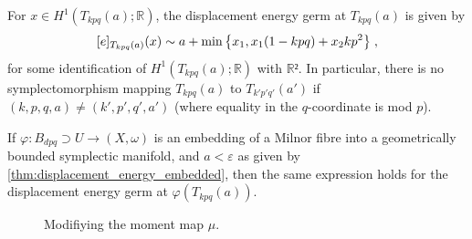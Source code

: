 \documentclass[12pt,a4paper,draft]{scrartcl}
\begin{document}
\begin{theorem}
  \label{thm:main}

  For $x ∈ H^1(T_{kpq}(a); ℝ)$, the displacement energy germ at $T_{kpq}(a)$ is given by
  \[ [e]_{T_{kpq}(a)} (x) \sim a + \min\qty{x_1, x_1 (1-kpq) + x_2 k p^2} \; , \]
  for some identification of $H^1(T_{kpq}(a);ℝ)$ with $ℝ²$.
  In particular, there is no symplectomorphism mapping $T_{kpq}(a)$ to $T_{k'p'q'}(a')$ if $(k,p,q,a) ≠ (k',p',q',a')$ (where equality in the $q$-coordinate is mod $p$).

  If $φ \colon B_{dpq} ⊃ U → (X,ω)$ is an embedding of a Milnor fibre into a geometrically bounded symplectic manifold, and $a<ε$ as given by \cref{thm:displacement_energy_embedded}, then the same expression holds for the displacement energy germ at $φ(T_{kpq}(a))$.
\end{theorem}

\begin{figure}
  \centering
  \caption{Modifiying the moment map $μ$.}
  \label{fig:mod_moment_map}
\end{figure}
\end{document}
